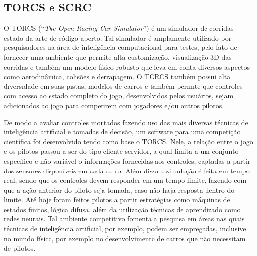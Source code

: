 \documentclass[conference]{IEEEtran}
\begin{document}
\subsection{TORCS e SCRC}
O TORCS (``\textit{The Open Racing Car Simulator}'') é um simulador de corridas estado da arte de código aberto. Tal simulador é amplamente utilizado por pesquisadores na área de inteligência computacional para testes, pelo fato de fornecer uma ambiente que permite alta customização, visualização 3D das corridas e também um modelo físico robusto que leva em conta diversos aspectos como aerodinâmica, colisões e derrapagem. O TORCS também possui alta diversidade em suas pistas, modelos de carros e também permite que controles com acesso ao estado completo do jogo, desenvolvidos pelos usuários, sejam adicionados ao jogo para competirem com jogadores e/ou outros pilotos.

De modo a avaliar controles montados fazendo uso das mais diversas técnicas de inteligência artificial e tomadas de decisão, um software para uma competição científica foi desenvolvido tendo como base o TORCS. Nele, a relação entre o jogo e os pilotos passou a ser do tipo cliente-servidor, a qual limita a um conjunto específico e não variável o informações fornecidas aos controles, captadas a partir dos sensores disponíveis em cada carro. Além disso a simulação é feita em tempo real, sendo que os controles devem responder em um tempo limite, fazendo com que a ação anterior do piloto seja tomada, caso não haja resposta dentro do limite. Até hoje foram feitos pilotos a partir estratégias como máquinas de estados finitos, lógica difusa, além da utilização técnicas de aprendizado como redes neurais. Tal ambiente competitivo fomenta a pesquisa em áreas nas quais técnicas de inteligência artificial, por exemplo, podem ser empregadas, inclusive no mundo físico, por exemplo no desenvolvimento de carros que não necessitam de pilotos.


\end{document}
